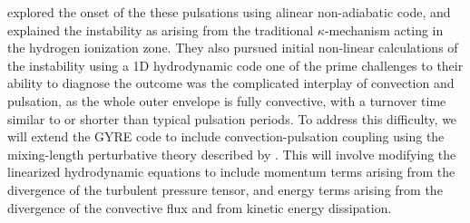 \citet{1997AampA...327..224H} explored the onset of the these pulsations using alinear non-adiabatic code, and explained the instability  as arising from the traditional $\kappa$-mechanism acting in the hydrogen ionization zone. They also pursued initial
non-linear calculations of the instability using a 1D hydrodynamic code one of the prime challenges to
their ability to diagnose the outcome was the complicated interplay of
convection and pulsation, as the whole outer envelope is fully
convective, with a turnover time similar to or shorter than typical pulsation periods. To address this difficulty, we will extend the GYRE code to include convection-pulsation coupling using the mixing-length perturbative theory described by \citet{Grigahcene:2005}. This will involve modifying the linearized hydrodynamic equations to include momentum terms arising from the divergence of the turbulent pressure tensor, and energy terms arising from the divergence of the convective flux and from kinetic energy dissipation.